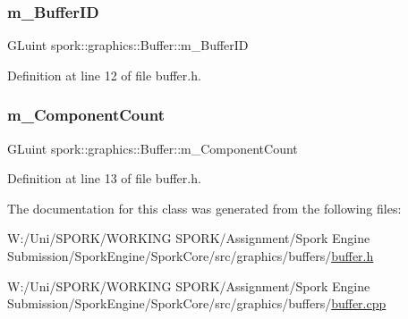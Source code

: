 \subsubsection{\texorpdfstring{m\+\_\+\+Buffer\+ID}{m\_BufferID}}
{\footnotesize\ttfamily G\+Luint spork\+::graphics\+::\+Buffer\+::m\+\_\+\+Buffer\+ID\hspace{0.3cm}{\ttfamily [private]}}



Definition at line 12 of file buffer.\+h.

\mbox{\label{classspork_1_1graphics_1_1_buffer_a8d6c9bc231ebb8eb39fe010761e4e631}} 
\subsubsection{\texorpdfstring{m\+\_\+\+Component\+Count}{m\_ComponentCount}}
{\footnotesize\ttfamily G\+Luint spork\+::graphics\+::\+Buffer\+::m\+\_\+\+Component\+Count\hspace{0.3cm}{\ttfamily [private]}}



Definition at line 13 of file buffer.\+h.



The documentation for this class was generated from the following files\+:\begin{DoxyCompactItemize}
\item 
W\+:/\+Uni/\+S\+P\+O\+R\+K/\+W\+O\+R\+K\+I\+N\+G S\+P\+O\+R\+K/\+Assignment/\+Spork Engine Submission/\+Spork\+Engine/\+Spork\+Core/src/graphics/buffers/\hyperlink{buffer_8h}{buffer.\+h}\item 
W\+:/\+Uni/\+S\+P\+O\+R\+K/\+W\+O\+R\+K\+I\+N\+G S\+P\+O\+R\+K/\+Assignment/\+Spork Engine Submission/\+Spork\+Engine/\+Spork\+Core/src/graphics/buffers/\hyperlink{buffer_8cpp}{buffer.\+cpp}\end{DoxyCompactItemize}
